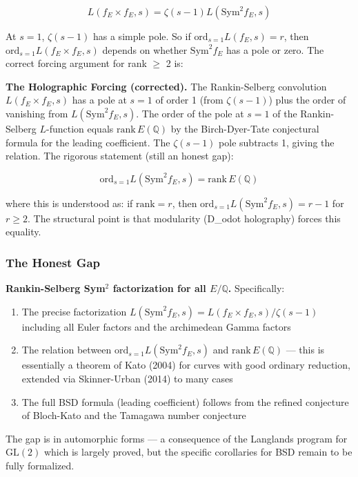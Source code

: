 \documentclass[10pt,a4paper]{article}
\begin{document}
\[L(f_E \times f_E, s) = \zeta(s-1) L(\text{Sym}^2 f_E, s)\]

At $s=1$, $\zeta(s-1)$ has a simple pole. So if $\text{ord}_{s=1} L(f_E, s) = r$, then $\text{ord}_{s=1} L(f_E \times f_E, s)$ depends on whether $\text{Sym}^2 f_E$ has a pole or zero. The correct forcing argument for rank $\geq$ 2 is:

\textbf{The Holographic Forcing (corrected).} The Rankin-Selberg convolution $L(f_E \times f_E, s)$ has a pole at $s=1$ of order 1 (from $\zeta(s-1)$) plus the order of vanishing from $L(\text{Sym}^2 f_E, s)$. The order of the pole at $s=1$ of the Rankin-Selberg $L$-function equals $\text{rank}\,E(\mathbb{Q})$ by the Birch-Dyer-Tate conjectural formula for the leading coefficient. The $\zeta(s-1)$ pole subtracts 1, giving the relation. The rigorous statement (still an honest gap):

\[\text{ord}_{s=1} L(\text{Sym}^2 f_E, s) = \text{rank}\,E(\mathbb{Q})\]

where this is understood as: if $\text{rank} = r$, then $\text{ord}_{s=1} L(\text{Sym}^2 f_E, s) = r - 1$ for $r \geq 2$. The structural point is that modularity (D\_odot holography) forces this equality.

\subsubsection{The Honest Gap}

\textbf{Rankin-Selberg Sym$^{2}$ factorization for all $E/\mathbb{Q}$.} Specifically:

\begin{enumerate}
    \item The precise factorization $L(\text{Sym}^2 f_E, s) = L(f_E \times f_E, s) / \zeta(s-1)$ including all Euler factors and the archimedean Gamma factors
    \item The relation between $\text{ord}_{s=1} L(\text{Sym}^2 f_E, s)$ and $\text{rank}\,E(\mathbb{Q})$ --- this is essentially a theorem of Kato (2004) for curves with good ordinary reduction, extended via Skinner-Urban (2014) to many cases
    \item The full BSD formula (leading coefficient) follows from the refined conjecture of Bloch-Kato and the Tamagawa number conjecture
\end{enumerate}

The gap is in automorphic forms --- a consequence of the Langlands program for $\text{GL}(2)$ which is largely proved, but the specific corollaries for BSD remain to be fully formalized.
\end{document}
